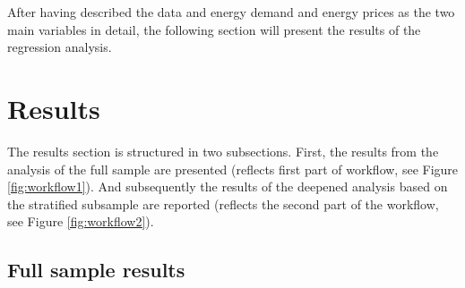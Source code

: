 \documentclass[12pt,twoside]{reedthesis}
\begin{document}
After having described the data and energy demand and energy prices as the two main variables in detail, the following section will present the results of the regression analysis.

\hypertarget{results}{%
\chapter{Results}\label{results}}

The results section is structured in two subsections. First, the results from the analysis of the full sample are presented (reflects first part of workflow, see Figure \ref{fig:workflow1}). And subsequently the results of the deepened analysis based on the stratified subsample are reported (reflects the second part of the workflow, see Figure \ref{fig:workflow2}).

\hypertarget{full_results}{%
\section{Full sample results}\label{full_results}}
\end{document}
